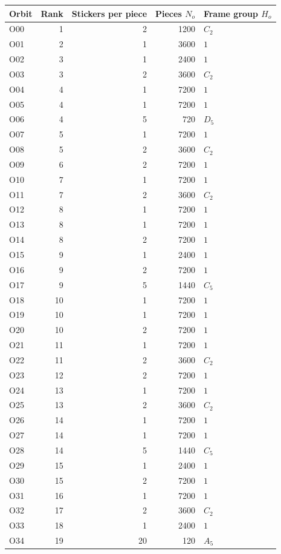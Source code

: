 \documentclass[
  10pt,
  a4paper,
]{article}
\newcounter{none} %
\begin{document}
{\def\LTcaptype{none} %
\begin{longtable}[]{@{}lrrrl@{}}
\toprule\noalign{}
Orbit & Rank & Stickers per piece & Pieces \(N_o\) & Frame group
\(H_o\) \\
\midrule\noalign{}
\endhead
\bottomrule\noalign{}
\endlastfoot
O00 & 1 & 2 & 1200 & \(C_2\) \\
O01 & 2 & 1 & 3600 & \(1\) \\
O02 & 3 & 1 & 2400 & \(1\) \\
O03 & 3 & 2 & 3600 & \(C_2\) \\
O04 & 4 & 1 & 7200 & \(1\) \\
O05 & 4 & 1 & 7200 & \(1\) \\
O06 & 4 & 5 & 720 & \(D_5\) \\
O07 & 5 & 1 & 7200 & \(1\) \\
O08 & 5 & 2 & 3600 & \(C_2\) \\
O09 & 6 & 2 & 7200 & \(1\) \\
O10 & 7 & 1 & 7200 & \(1\) \\
O11 & 7 & 2 & 3600 & \(C_2\) \\
O12 & 8 & 1 & 7200 & \(1\) \\
O13 & 8 & 1 & 7200 & \(1\) \\
O14 & 8 & 2 & 7200 & \(1\) \\
O15 & 9 & 1 & 2400 & \(1\) \\
O16 & 9 & 2 & 7200 & \(1\) \\
O17 & 9 & 5 & 1440 & \(C_5\) \\
O18 & 10 & 1 & 7200 & \(1\) \\
O19 & 10 & 1 & 7200 & \(1\) \\
O20 & 10 & 2 & 7200 & \(1\) \\
O21 & 11 & 1 & 7200 & \(1\) \\
O22 & 11 & 2 & 3600 & \(C_2\) \\
O23 & 12 & 2 & 7200 & \(1\) \\
O24 & 13 & 1 & 7200 & \(1\) \\
O25 & 13 & 2 & 3600 & \(C_2\) \\
O26 & 14 & 1 & 7200 & \(1\) \\
O27 & 14 & 1 & 7200 & \(1\) \\
O28 & 14 & 5 & 1440 & \(C_5\) \\
O29 & 15 & 1 & 2400 & \(1\) \\
O30 & 15 & 2 & 7200 & \(1\) \\
O31 & 16 & 1 & 7200 & \(1\) \\
O32 & 17 & 2 & 3600 & \(C_2\) \\
O33 & 18 & 1 & 2400 & \(1\) \\
O34 & 19 & 20 & 120 & \(A_5\) \\
\end{longtable}
}
\end{document}
